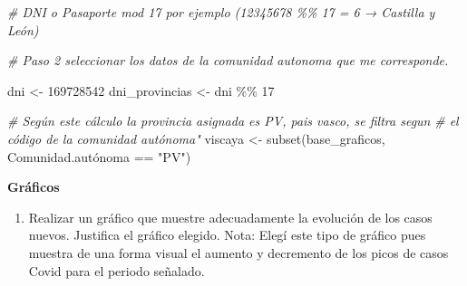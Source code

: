 \documentclass[
  12pt,
]{article}
\newenvironment{Shaded}{\begin{snugshade}}{\end{snugshade}}
\newcommand{\AttributeTok}[1]{\textcolor[rgb]{0.77,0.63,0.00}{#1}}
\newcommand{\CommentTok}[1]{\textcolor[rgb]{0.56,0.35,0.01}{\textit{#1}}}
\newcommand{\DecValTok}[1]{\textcolor[rgb]{0.00,0.00,0.81}{#1}}
\newcommand{\FunctionTok}[1]{\textcolor[rgb]{0.00,0.00,0.00}{#1}}
\newcommand{\NormalTok}[1]{#1}
\newcommand{\OtherTok}[1]{\textcolor[rgb]{0.56,0.35,0.01}{#1}}
\newcommand{\SpecialCharTok}[1]{\textcolor[rgb]{0.00,0.00,0.00}{#1}}
\newcommand{\StringTok}[1]{\textcolor[rgb]{0.31,0.60,0.02}{#1}}
\providecommand{\tightlist}{%
  \setlength{\itemsep}{0pt}\setlength{\parskip}{0pt}}
\begin{document}
\begin{Shaded}
\begin{Highlighting}[]
\CommentTok{\# DNI o Pasaporte mod 17 por ejemplo (12345678 \%\% 17 = 6 → Castilla y León)}

\CommentTok{\# Paso 2 seleccionar los datos de la comunidad autonoma que me corresponde.}

\NormalTok{dni }\OtherTok{\textless{}{-}} \DecValTok{169728542}
\NormalTok{dni\_provincias }\OtherTok{\textless{}{-}}\NormalTok{ dni }\SpecialCharTok{\%\%} \DecValTok{17}

\CommentTok{\# Según este cálculo la provincia asignada es PV, pais vasco, se filtra segun }
\CommentTok{\# el código de la comunidad autónoma"}
\NormalTok{viscaya }\OtherTok{\textless{}{-}} \FunctionTok{subset}\NormalTok{(base\_graficos, Comunidad.autónoma }\SpecialCharTok{==} \StringTok{"PV"}\NormalTok{)}
\end{Highlighting}
\end{Shaded}

\textbf{Gráficos}

\begin{enumerate}
\def\labelenumi{\alph{enumi})}
\setcounter{enumi}{2}
\tightlist
\item
  Realizar un gráfico que muestre adecuadamente la evolución de los
  casos nuevos. Justifica el gráfico elegido. Nota: Elegí este tipo de
  gráfico pues muestra de una forma visual el aumento y decremento de
  los picos de casos Covid para el periodo señalado.
\end{enumerate}

\begin{Shaded}
\end{Shaded}
\end{document}
